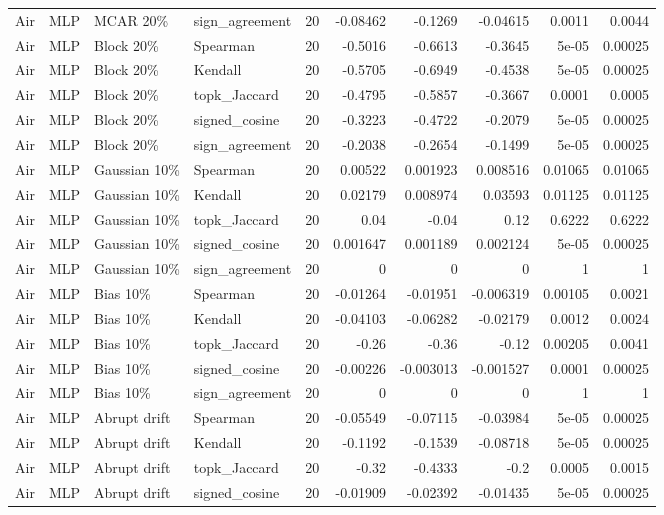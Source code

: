 \begin{tabular}{llllrrrrrr}
Air & MLP & MCAR 20\% & sign\_agreement & 20 & -0.08462 & -0.1269 & -0.04615 & 0.0011 & 0.0044 \\
Air & MLP & Block 20\% & Spearman & 20 & -0.5016 & -0.6613 & -0.3645 & 5e-05 & 0.00025 \\
Air & MLP & Block 20\% & Kendall & 20 & -0.5705 & -0.6949 & -0.4538 & 5e-05 & 0.00025 \\
Air & MLP & Block 20\% & topk\_Jaccard & 20 & -0.4795 & -0.5857 & -0.3667 & 0.0001 & 0.0005 \\
Air & MLP & Block 20\% & signed\_cosine & 20 & -0.3223 & -0.4722 & -0.2079 & 5e-05 & 0.00025 \\
Air & MLP & Block 20\% & sign\_agreement & 20 & -0.2038 & -0.2654 & -0.1499 & 5e-05 & 0.00025 \\
Air & MLP & Gaussian 10\% & Spearman & 20 & 0.00522 & 0.001923 & 0.008516 & 0.01065 & 0.01065 \\
Air & MLP & Gaussian 10\% & Kendall & 20 & 0.02179 & 0.008974 & 0.03593 & 0.01125 & 0.01125 \\
Air & MLP & Gaussian 10\% & topk\_Jaccard & 20 & 0.04 & -0.04 & 0.12 & 0.6222 & 0.6222 \\
Air & MLP & Gaussian 10\% & signed\_cosine & 20 & 0.001647 & 0.001189 & 0.002124 & 5e-05 & 0.00025 \\
Air & MLP & Gaussian 10\% & sign\_agreement & 20 & 0 & 0 & 0 & 1 & 1 \\
Air & MLP & Bias 10\% & Spearman & 20 & -0.01264 & -0.01951 & -0.006319 & 0.00105 & 0.0021 \\
Air & MLP & Bias 10\% & Kendall & 20 & -0.04103 & -0.06282 & -0.02179 & 0.0012 & 0.0024 \\
Air & MLP & Bias 10\% & topk\_Jaccard & 20 & -0.26 & -0.36 & -0.12 & 0.00205 & 0.0041 \\
Air & MLP & Bias 10\% & signed\_cosine & 20 & -0.00226 & -0.003013 & -0.001527 & 0.0001 & 0.00025 \\
Air & MLP & Bias 10\% & sign\_agreement & 20 & 0 & 0 & 0 & 1 & 1 \\
Air & MLP & Abrupt drift & Spearman & 20 & -0.05549 & -0.07115 & -0.03984 & 5e-05 & 0.00025 \\
Air & MLP & Abrupt drift & Kendall & 20 & -0.1192 & -0.1539 & -0.08718 & 5e-05 & 0.00025 \\
Air & MLP & Abrupt drift & topk\_Jaccard & 20 & -0.32 & -0.4333 & -0.2 & 0.0005 & 0.0015 \\
Air & MLP & Abrupt drift & signed\_cosine & 20 & -0.01909 & -0.02392 & -0.01435 & 5e-05 & 0.00025 \\

\end{tabular}
